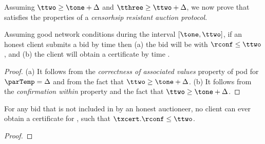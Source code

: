 Assuming $\ttwo \geq \tone + \Delta$ and $\tthree \geq \ttwo + \Delta$, we now prove that  satisfies the properties of a \emph{censorhsip resistant auction protocol}. 



\begin{lemma}
    Assuming good network conditions during the interval $[\tone, \ttwo]$, if an honest client submits a bid by time \tone then
    (a) the bid will be \confirmed with $\rconf \leq \ttwo$, and (b) the client will obtain a certificate \txcert by time \ttwo.
\end{lemma}
\begin{proof}
    (a) It follows from the \emph{correctness of associated values} property of pod for $\parTemp = \Delta$ and from the fact that  $\ttwo \geq \tone + \Delta$.
    (b) It follows from the \emph{confirmation within \parConf} property and the fact that $\ttwo \geq \tone + \Delta$.
\end{proof}

\begin{lemma}
    For any bid \bid that is not included in \bag by an honest auctioneer, no client can ever obtain a certificate \txcert for \bid, such that $\txcert.\rconf \leq \ttwo$.
\end{lemma}
\begin{proof}
\end{proof}


